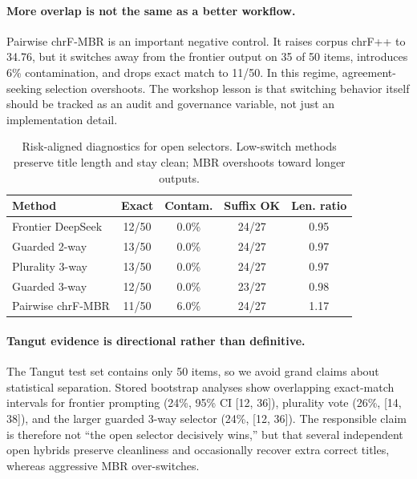 \documentclass{article}
\begin{document}
\paragraph{More overlap is not the same as a better workflow.}
Pairwise chrF-MBR is an important negative control. It raises corpus chrF++ to 34.76, but it switches away from the frontier output on 35 of 50 items, introduces 6\% contamination, and drops exact match to 11/50. In this regime, agreement-seeking selection overshoots. The workshop lesson is that switching behavior itself should be tracked as an audit and governance variable, not just an implementation detail.

\begin{table}[t]
\centering
\small
\begin{tabularx}{\columnwidth}{@{}>{\raggedright\arraybackslash}Xcccc@{}}
\toprule
Method & Exact & Contam. & Suffix OK & Len. ratio \\
\midrule
Frontier DeepSeek & 12/50 & 0.0\% & 24/27 & 0.95 \\
Guarded 2-way & 13/50 & 0.0\% & 24/27 & 0.97 \\
Plurality 3-way & 13/50 & 0.0\% & 24/27 & 0.97 \\
Guarded 3-way & 12/50 & 0.0\% & 23/27 & 0.98 \\
Pairwise chrF-MBR & 11/50 & 6.0\% & 24/27 & 1.17 \\
\bottomrule
\end{tabularx}
\caption{Risk-aligned diagnostics for open selectors. Low-switch methods preserve title length and stay clean; MBR overshoots toward longer outputs.}
\label{tab:riskdiag}
\end{table}

\paragraph{Tangut evidence is directional rather than definitive.}
The Tangut test set contains only 50 items, so we avoid grand claims about statistical separation. Stored bootstrap analyses show overlapping exact-match intervals for frontier prompting (24\%, 95\% CI [12, 36]), plurality vote (26\%, [14, 38]), and the larger guarded 3-way selector (24\%, [12, 36]). The responsible claim is therefore not ``the open selector decisively wins,'' but that several independent open hybrids preserve cleanliness and occasionally recover extra correct titles, whereas aggressive MBR over-switches.
\end{document}
